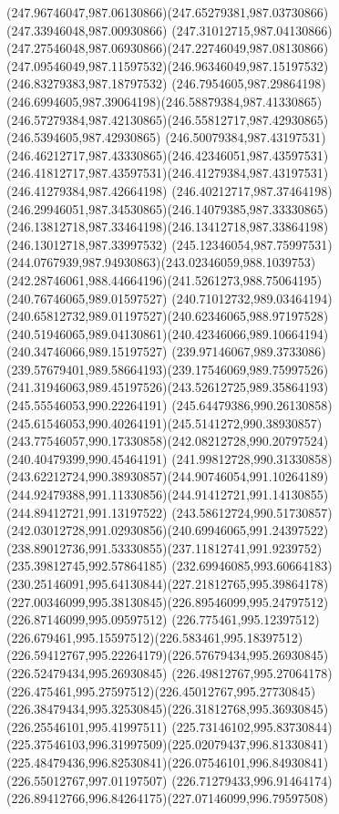 {{\curveto(247.96746047,987.06130866)(247.65279381,987.03730866)(247.33946048,987.00930866)
\curveto(247.31012715,987.04130866)(247.27546048,987.06930866)(247.22746049,987.08130866)
\curveto(247.09546049,987.11597532)(246.96346049,987.15197532)(246.83279383,987.18797532)
\curveto(246.7954605,987.29864198)(246.6994605,987.39064198)(246.58879384,987.41330865)
\curveto(246.57279384,987.42130865)(246.55812717,987.42930865)(246.5394605,987.42930865)
\curveto(246.50079384,987.43197531)(246.46212717,987.43330865)(246.42346051,987.43597531)
\curveto(246.41812717,987.43597531)(246.41279384,987.43197531)(246.41279384,987.42664198)
\curveto(246.40212717,987.37464198)(246.29946051,987.34530865)(246.14079385,987.33330865)
\curveto(246.13812718,987.33464198)(246.13412718,987.33864198)(246.13012718,987.33997532)
\curveto(245.12346054,987.75997531)(244.0767939,987.94930863)(243.02346059,988.1039753)
\curveto(242.28746061,988.44664196)(241.5261273,988.75064195)(240.76746065,989.01597527)
\curveto(240.71012732,989.03464194)(240.65812732,989.01197527)(240.62346065,988.97197528)
\curveto(240.51946065,989.04130861)(240.42346066,989.10664194)(240.34746066,989.15197527)
\curveto(239.97146067,989.3733086)(239.57679401,989.58664193)(239.17546069,989.75997526)
\curveto(241.31946063,989.45197526)(243.52612725,989.35864193)(245.55546053,990.22264191)
\curveto(245.64479386,990.26130858)(245.61546053,990.40264191)(245.5141272,990.38930857)
\curveto(243.77546057,990.17330858)(242.08212728,990.20797524)(240.40479399,990.45464191)
\curveto(241.99812728,990.31330858)(243.62212724,990.38930857)(244.90746054,991.10264189)
\curveto(244.92479388,991.11330856)(244.91412721,991.14130855)(244.89412721,991.13197522)
\curveto(243.58612724,990.51730857)(242.03012728,991.02930856)(240.69946065,991.24397522)
\curveto(238.89012736,991.53330855)(237.11812741,991.9239752)(235.39812745,992.57864185)
\curveto(232.69946085,993.60664183)(230.25146091,995.64130844)(227.21812765,995.39864178)
\curveto(227.00346099,995.38130845)(226.89546099,995.24797512)(226.87146099,995.09597512)
\curveto(226.775461,995.12397512)(226.679461,995.15597512)(226.583461,995.18397512)
\curveto(226.59412767,995.22264179)(226.57679434,995.26930845)(226.52479434,995.26930845)
\curveto(226.49812767,995.27064178)(226.475461,995.27597512)(226.45012767,995.27730845)
\curveto(226.38479434,995.32530845)(226.31812768,995.36930845)(226.25546101,995.41997511)
\curveto(225.73146102,995.83730844)(225.37546103,996.31997509)(225.02079437,996.81330841)
\curveto(225.48479436,996.82530841)(226.07546101,996.84930841)(226.55012767,997.01197507)
\curveto(226.71279433,996.91464174)(226.89412766,996.84264175)(227.07146099,996.79597508)
}}
